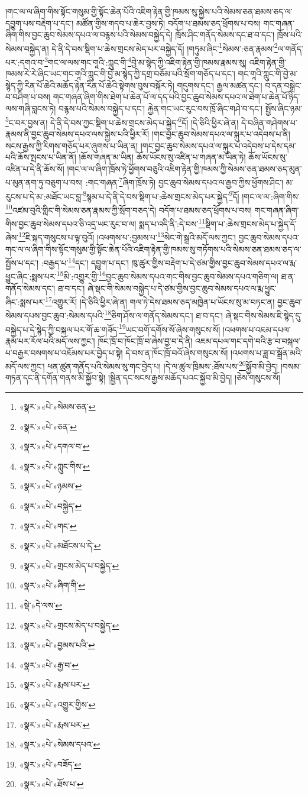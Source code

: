 །གང་ལ་ལ་ཞིག་གིས་སྟོང་གསུམ་གྱི་སྟོང་ཆེན་པོའི་འཇིག་རྟེན་གྱི་ཁམས་སུ་སྐྱེས་པའི་སེམས་ཅན་ཐམས་ཅད་ལ་དབྱུག་པས་བརྡེག་པ་དང་། མཚོན་གྱིས་གདབ་པ་ཆེར་བྱས་ཏེ། བདོག་པ་ཐམས་ཅད་ཕྲོགས་པ་བས། གང་གཞན་ཞིག་གིས་བྱང་ཆུབ་སེམས་དཔའ་ལ་བརྙས་པའི་སེམས་བསྐྱེད་དེ། ཁྲོས་ཤིང་གནོད་སེམས་དང་ཐ་བ་དང་། ཁྲོས་པའི་སེམས་བསྐྱེད་ན། དེ་ནི་དེ་བས་སྡིག་པ་ཆེས་གྲངས་མེད་པར་བསྐྱེད་དོ། །གཏུམ་ཞིང་\footnote{«སྣར་»«པེ་»སེམས་ཅན་}སེམས་:ཅན་རྣམས་\footnote{«སྣར་»«པེ་»ཅན་}ལ་གནོད་པར་:དགའ་བ་\footnote{«སྣར་»«པེ་»དགལ་བ་}གང་ལ་ལས་གང་གཱའི་:ཀླུང་གི་\footnote{«སྣར་»«པེ་»ཀླུང་གིས་}བྱེ་མ་སྙེད་ཀྱི་འཇིག་རྟེན་གྱི་ཁམས་རྣམས་སུ། འཇིག་རྟེན་གྱི་ཁམས་རེ་རེ་ཞིང་ཡང་གང་གཱའི་ཀླུང་གི་བྱེ་མ་སྙེད་ཀྱི་དགྲ་བཅོམ་པའི་སྲོག་གཅོད་པ་དང་། གང་གཱའི་ཀླུང་གི་བྱེ་མ་སྙེད་ཀྱི་རིན་པོ་ཆེའི་མཆོད་རྟེན་རིན་པོ་ཆེའི་སྟེགས་བུས་བསྐོར་ཏེ། གདུགས་དང་། རྒྱལ་མཚན་དང་། བ་དན་བསྒྲེང་བ་བཤིག་པ་བས། གང་གཞན་ཞིག་གིས་ཐེག་པ་ཆེན་པོ་ལ་དད་པའི་བྱང་ཆུབ་སེམས་དཔའ་ལ་ཐེག་པ་ཆེན་པོ་ཉིད་ལས་གཞི་བླངས་ཏེ། བརྙས་པའི་སེམས་བསྐྱེད་པ་དང་། རྐྱེན་གང་ཡང་རུང་བས་ཁྲོ་ཞིང་གཤེ་བ་དང་། སྤྱོས་ཞིང་ཉམ་\footnote{«སྣར་»«པེ་»ཉམས་}ང་བར་བྱས་ན། དེ་ནི་དེ་བས་ཀྱང་སྡིག་པ་ཆེས་གྲངས་མེད་པ་སྐྱེད་\footnote{«སྣར་»«པེ་»བསྐྱེད་}དོ། །དེ་ཅིའི་ཕྱིར་ཞེ་ན། དེ་བཞིན་གཤེགས་པ་རྣམས་ནི་བྱང་ཆུབ་སེམས་དཔའ་ལས་སྐྱེས་པའི་ཕྱིར་རོ། །གང་བྱང་ཆུབ་སེམས་དཔའ་ལ་སྐུར་པ་འདེབས་པ་ནི། སངས་རྒྱས་ཀྱི་རིགས་གཅོད་པར་ཞུགས་པ་ཡིན་ན། །གང་བྱང་ཆུབ་སེམས་དཔའ་ལ་སྐུར་པ་འདེབས་པ་དེས་དམ་པའི་ཆོས་སྤངས་པ་ཡིན་ནོ། །ཆོས་གཞན་མ་ཡིན། ཆོས་ཡོངས་སུ་འཛིན་པ་གཞན་མ་ཡིན་ཏེ། ཆོས་ཡོངས་སུ་འཛིན་པ་དེ་ནི་ཆོས་སོ། །གང་ལ་ལ་ཞིག་ཁྲོས་ཏེ་ཕྱོགས་བཅུའི་འཇིག་རྟེན་གྱི་ཁམས་ཀྱི་སེམས་ཅན་ཐམས་ཅད་མུན་པ་མུན་ནག་ཏུ་བཅུག་པ་བས། :གང་གཞན་\footnote{«སྣར་»«པེ་»གང་}ཞིག་ཁྲོས་ཏེ། བྱང་ཆུབ་སེམས་དཔའ་ལ་རྒྱབ་ཀྱིས་ཕྱོགས་ཤིང་། མ་རུངས་པ་དེ་མ་:མཐོང་ཡང་བླ་\footnote{«སྣར་»«པེ་»མཐོངས་པ་དེ་}སྙམ་པ་དེ་ནི་དེ་བས་སྡིག་པ་:ཆེས་གྲངས་མེད་པར་སྐྱེད་\footnote{«སྣར་»«པེ་»གྲངས་མེད་པ་བསྐྱེད་}དོ། །གང་ལ་ལ་:ཞིག་གིས་\footnote{«སྣར་»«པེ་»ཞིག་གི་}འཛམ་བུའི་གླིང་གི་སེམས་ཅན་རྣམས་ཀྱི་སྲོག་བཅད་དེ། བདོག་པ་ཐམས་ཅད་ཕྲོགས་པ་བས། གང་གཞན་ཞིག་གིས་བྱང་ཆུབ་སེམས་དཔའ་ཅི་འདྲ་ཡང་རུང་བ་ལ། སྨད་པ་འདི་ནི་:དེ་བས་\footnote{«སྡེ་»དེ་ལས་}སྡིག་པ་:ཆེས་གྲངས་མེད་པ་སྐྱེད་དོ་ཞེས་\footnote{«སྣར་»«པེ་»གྲངས་མེད་པ་བསྐྱེད་}ཇི་སྐད་གསུངས་པ་ལྟ་བུའོ། །འཕགས་པ་:བྱམས་པ་\footnote{«སྣར་»«པེ་»བྱམས་པའི་}སེང་གེ་སྒྲའི་མདོ་ལས་ཀྱང་། བྱང་ཆུབ་སེམས་དཔའ་གང་ལ་ལ་ཞིག་གིས་སྟོང་གསུམ་གྱི་སྟོང་ཆེན་པོའི་འཇིག་རྟེན་གྱི་ཁམས་སུ་གཏོགས་པའི་སེམས་ཅན་ཐམས་ཅད་ལ་སྤྱོས་པ་དང་། :བརྒྱད་པ་\footnote{«སྣར་»«པེ་»རྒྱ་བ་}དང་། དབྱུག་པ་དང་། ཁུ་ཚུར་གྱིས་བརྡེག་པ་དེ་ཙམ་གྱིས་བྱང་ཆུབ་སེམས་དཔའ་ལ་རྨ་ཕྱུང་ཞིང་:སྨས་པར་\footnote{«སྣར་»«པེ་»རྨས་པར་}མི་:འགྱུར་གྱི་\footnote{«སྣར་»«པེ་»འགྱུར་གྱིས་}བྱང་ཆུབ་སེམས་དཔའ་གང་གིས་བྱང་ཆུབ་སེམས་དཔའ་གཅིག་ལ། ཐ་ན་གནོད་སེམས་དང་། ཐ་བ་དང་། ཞེ་སྡང་གི་སེམས་བསྐྱེད་པ་དེ་ཙམ་གྱིས་བྱང་ཆུབ་སེམས་དཔའ་ལ་རྨ་ཕྱུང་ཞིང་:སྨས་པར་\footnote{«སྣར་»«པེ་»རྨས་པར་}འགྱུར་རོ། །དེ་ཅིའི་ཕྱིར་ཞེ་ན། གལ་ཏེ་དེས་ཐམས་ཅད་མཁྱེན་པ་ཡོངས་སུ་མ་བཏང་ན། བྱང་ཆུབ་སེམས་དཔས་བྱང་ཆུབ་:སེམས་དཔའི་\footnote{«སྣར་»«པེ་»སེམས་དཔའ་}ཅིག་ཤོས་ལ་གནོད་སེམས་དང་། ཐ་བ་དང་། ཞེ་སྡང་གིས་སེམས་ཇི་སྙེད་དུ་བསྐྱེད་པ་དེ་སྙེད་ཀྱི་བསྐལ་པར་གོ་ཆ་གཟོད་\footnote{«སྣར་»«པེ་»བཟོད་}ཡང་བགོ་དགོས་སོ་ཞེས་གསུངས་སོ། །འཕགས་པ་འཇམ་དཔལ་རྣམ་པར་རོལ་པའི་མདོ་ལས་ཀྱང་། ཁོང་ཁྲོ་བ་ཁོང་ཁྲོ་བ་ཞེས་བྱ་བ་དེ་ནི། འཇམ་དཔལ་གང་དགེ་བའི་རྩ་བ་བསྐལ་པ་བརྒྱར་བསགས་པ་འཇོམས་པར་བྱེད་པ་སྟེ། དེ་བས་ན་ཁོང་ཁྲོ་བའོ་ཞེས་གསུངས་སོ། །འཕགས་པ་ཟླ་བ་སྒྲོན་མའི་མདོ་ལས་ཀྱང་། ཕན་ཚུན་གནོད་པའི་སེམས་སུ་གང་བྱེད་པ། །དེ་ལ་ཚུལ་ཁྲིམས་:ཐོས་པས་\footnote{«སྣར་»«པེ་»ཐོས་པ་}སྐྱོབ་མི་བྱེད། །བསམ་གཏན་དང་ནི་དགོན་གནས་མི་སྐྱོབ་སྟེ། །སྦྱིན་དང་སངས་རྒྱས་མཆོད་པའང་སྐྱོབ་མི་བྱེད། །ཅེས་གསུངས་སོ། 